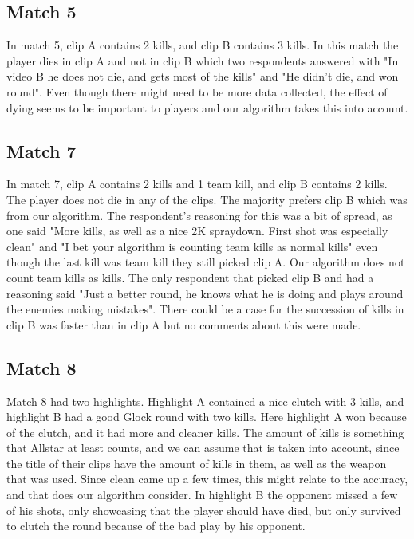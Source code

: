 \subsection*{Match 5}
In match 5, clip A contains 2 kills, and clip B contains 3 kills. In this match the player dies in clip A and not in clip B which two respondents answered with "In video B he does not die, and gets most of the kills" and "He didn't die, and won round". Even though there might need to be more data collected, the effect of dying seems to be important to players and our algorithm takes this into account. 
\subsection*{Match 7}
In match 7, clip A contains 2 kills and 1 team kill, and clip B contains 2 kills. The player does not die in any of the clips. The majority prefers clip B which was from our algorithm. The respondent's reasoning for this was a bit of spread, as one said "More kills, as well as a nice 2K spraydown. First shot was especially clean" and "I bet your algorithm is counting team kills as normal kills" even though the last kill was team kill they still picked clip A. Our algorithm does not count team kills as kills. The only respondent that picked clip B and had a reasoning said "Just a better round, he knows what he is doing and plays around the enemies making mistakes". There could be a case for the succession of kills in clip B was faster than in clip A but no comments about this were made.
\subsection*{Match 8}
Match 8 had two highlights. Highlight A contained a nice clutch with 3 kills, and highlight B had a good Glock round with two kills. Here highlight A won because of the clutch, and it had more and cleaner kills. The amount of kills is something that Allstar at least counts, and we can assume that is taken into account, since the title of their clips have the amount of kills in them, as well as the weapon that was used. Since clean came up a few times, this might relate to the accuracy, and that does our algorithm consider. In highlight B the opponent missed a few of his shots, only showcasing that the player should have died, but only survived to clutch the round because of the bad play by his opponent.
